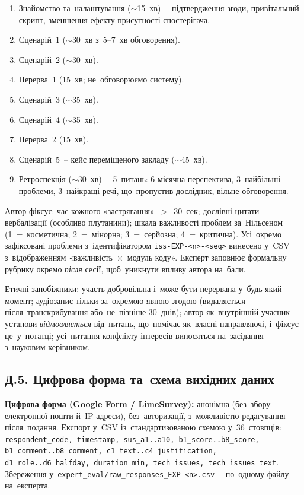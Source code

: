 \begin{enumerate}[noitemsep,topsep=2pt,leftmargin=*]
    \item Знайомство та~налаштування ($\sim$15~хв)~-- підтвердження згоди, привітальний скрипт, зменшення ефекту присутності спостерігача.
    \item Сценарій~1 ($\sim$30~хв з~5--7~хв обговорення).
    \item Сценарій~2 ($\sim$30~хв).
    \item Перерва~1 (15~хв; не~обговорюємо систему).
    \item Сценарій~3 ($\sim$35~хв).
    \item Сценарій~4 ($\sim$35~хв).
    \item Перерва~2 (15~хв).
    \item Сценарій~5~-- кейс переміщеного закладу ($\sim$45~хв).
    \item Ретроспекція ($\sim$30~хв)~-- 5~питань: 6-місячна перспектива, 3~найбільші проблеми, 3~найкращі речі, що~пропустив дослідник, вільне обговорення.
\end{enumerate}

Автор фіксує: час кожного «застрягання»~$>$~30~сек; дослівні цитати-вербалізації (особливо плутанини); шкала важливості проблем за~Нільсеном (1~=~косметична; 2~=~мінорна; 3~=~серйозна; 4~=~критична). Усі~окремо зафіксовані проблеми з~ідентифікатором \texttt{iss-EXP-<n>-<seq>} винесено у~CSV з~відображенням «важливість~$\times$~модуль коду». Експерт заповнює формальну рубрику окремо \emph{після} сесії, щоб~уникнути впливу автора на~бали.

Етичні запобіжники: участь добровільна і~може бути перервана у~будь-який момент; аудіозапис тільки за~окремою явною згодою (видаляється після~транскрибування або~не~пізніше 30~днів); автор як~внутрішній учасник установи \emph{відмовляється} від~питань, що~помічає як~власні направляючі, і~фіксує це~у~нотатці; усі~питання конфлікту інтересів виносяться на~засідання з~науковим керівником.

\subsection*{Д.5. Цифрова форма та~схема вихідних даних}
\label{app:eval-form}

\textbf{Цифрова форма (Google Form / LimeSurvey):} анонімна (без~збору електронної пошти й~IP-адреси), без~авторизації, з~можливістю редагування після~подання. Експорт у~CSV із~стандартизованою схемою у~36~стовпців: \texttt{respondent\_code, timestamp, sus\_a1..a10, b1\_score..b8\_score, b1\_comment..b8\_comment, c1\_text..c4\_justification, d1\_role..d6\_halfday, duration\_min, tech\_issues, tech\_issues\_text}. Збереження у~\texttt{expert\_eval/raw\_responses\_EXP-<n>.csv}~-- по~одному файлу на~експерта.

